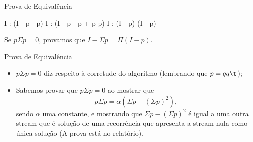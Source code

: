 \begin{frame}{Prova de Equivalência}

  \vspace{0.5cm}

  \begin{calculation}[=]
    I : (I - p - \Sigma p)
    I : (I - p - \Sigma p + p \Sigma p)
    I : (I - p) \cdot (I - \Sigma p)
  \end{calculation}

  \pause

  \begin{center}
    Se $p \Sigma p = 0$, provamos que $I - \Sigma p = \Pi (I - p)$.
  \end{center}
\end{frame}

\begin{frame}{Prova de Equivalência}
  \begin{itemize}
    \item $p \Sigma p = 0$ diz respeito à corretude do algoritmo (lembrando que $p = qq\t$); \\[0.5cm] \pause
    \item Sabemos provar que $p \Sigma p = 0$ ao mostrar que \[p \Sigma p = \alpha \left( \Sigma p - \left( \Sigma p \right)^2 \right),\] sendo $\alpha$ uma constante, e mostrando que $\Sigma p - \left( \Sigma p \right)^2$ é igual a uma outra stream que é solução de uma recorrência que apresenta a stream nula como única solução (A prova está no relatório).
  \end{itemize}
\end{frame}